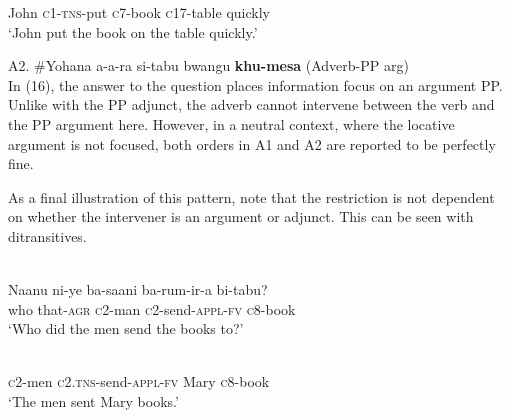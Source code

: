 \documentclass[output=paper]{langsci/langscibook}
\begin{document}
\ea\label{ex:}
\\
\ea\label{ex:}
\\
\ea\label{ex:}
\\
\ea\label{ex:}
  \\


\ea\label{ex:}
\\

       John       \textsc{c1-tns-}put  \textsc{c}7-book   \textsc{c}17-table   quickly\\
\glt   ‘John put the book on the table quickly.’   
\z

\gll A2.  \#Yohana   a-a-ra   si-tabu      bwangu   \textbf{khu-mesa}         (Adverb-PP arg)\\
In (16), the answer to the question places information focus on an argument PP. Unlike with the PP adjunct, the adverb cannot intervene between the verb and the PP argument here. However, in a neutral context, where the locative argument is not focused, both orders in A1 and A2 are reported to be perfectly fine.

  As a final illustration of this pattern, note that the restriction is not dependent on whether the intervener is an argument or adjunct. This can be seen with ditransitives. 


\ea\label{ex:}
\\

\gll   Naanu    ni-ye    ba-saani   ba-rum-ir-a     bi-tabu?\\
     who     that-\textsc{agr}   \textsc{c}2-man   \textsc{c}2-send-\textsc{appl-fv}   \textsc{c}8-book\\
\glt ‘Who did the men send the books to?’
\z




\ea\label{ex:}
 \\

       \textsc{c}2-men   \textsc{c2.tns}-send-\textsc{appl-fv}   Mary      \textsc{c}8-book  \\
\glt    ‘The men sent Mary books.’
\z
\end{document}
